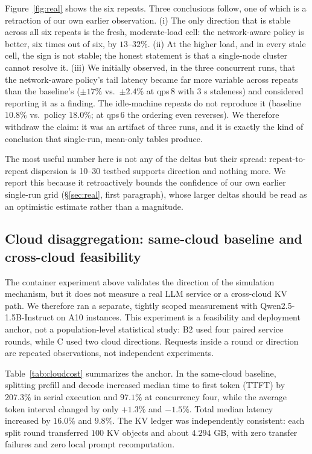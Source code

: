 Figure~\ref{fig:real} shows the six repeats. Three conclusions follow, one of which is a retraction of our own earlier observation.
(i) The only direction that is stable across all six repeats is the fresh, moderate-load cell:
the network-aware policy is better, six times out of six, by $13$--$32\%$.
(ii) At the higher load, and in every stale cell, the sign is not stable; the honest statement is
that a single-node cluster cannot resolve it.
(iii) We initially observed, in the three concurrent runs, that the network-aware policy's tail
latency became far more variable across repeats than the baseline's ($\pm17\%$ vs.\ $\pm2.4\%$ at
qps\,8 with 3 s staleness) and considered reporting it as a finding. The idle-machine
repeats do not reproduce it (baseline $10.8\%$ vs.\ policy $18.0\%$; at qps\,6 the ordering even
reverses). We therefore withdraw the claim: it was an artifact of three runs, and it is exactly
the kind of conclusion that single-run, mean-only tables produce.

The most useful number here is not any of the deltas but their spread: repeat-to-repeat
dispersion is 10--30 %
testbed supports direction and nothing more. We report this because it retroactively bounds the
confidence of our own earlier single-run grid (\S\ref{sec:real}, first paragraph), whose larger
deltas should be read as an optimistic estimate rather than a magnitude.

\subsection{Cloud disaggregation: same-cloud baseline and cross-cloud feasibility}
\label{sec:real:cloud}

The container experiment above validates the direction of the simulation mechanism, but it does
not measure a real LLM service or a cross-cloud KV path. We therefore ran a separate, tightly
scoped measurement with Qwen2.5-1.5B-Instruct on A10 instances. This experiment is a feasibility
and deployment anchor, not a population-level statistical study: B2 used four paired service
rounds, while C used two cloud directions. Requests inside a round or direction are repeated
observations, not independent experiments.

Table~\ref{tab:cloudcost} summarizes the anchor. In the same-cloud baseline, splitting prefill
and decode increased median time to first token (TTFT) by $207.3\%$ in serial execution and
$97.1\%$ at concurrency four, while the average token interval changed by only $+1.3\%$ and
$-1.5\%$. Total median latency increased by $16.0\%$ and $9.8\%$. The KV ledger was
independently consistent: each split round transferred $100$ KV objects and about $4.294$ GB,
with zero transfer failures and zero local prompt recomputation.

